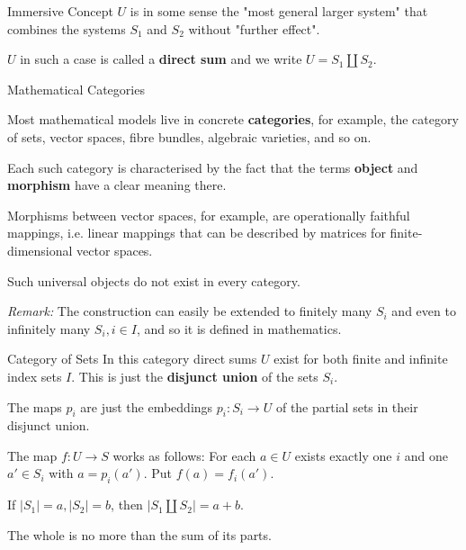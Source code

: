 \documentclass{beamer}
\begin{document}
\begin{frame}{Immersive Concept}
$U$ is in some sense the "most general larger system" that combines the
  systems $S_1$ and $S_2$ without "further effect".
  
$U$ in such a case is called a \textbf{direct sum} and we write $U = S_1
  \coprod S_2$.
\begin{center}
\end{center}
\end{frame}
\begin{frame}{Mathematical Categories}

Most mathematical models live in concrete \textbf{categories}, for example,
the category of sets, vector spaces, fibre bundles, algebraic varieties, and
so on.

Each such category is characterised by the fact that the terms \textbf{object}
and \textbf{morphism} have a clear meaning there.

Morphisms between vector spaces, for example, are operationally faithful
mappings, i.e. linear mappings that can be described by matrices for
finite-dimensional vector spaces.

Such universal objects do not exist in every category.

\emph{Remark:} The construction can easily be extended to finitely many $S_i$
and even to infinitely many $S_i, i\in I$, and so it is defined in
mathematics.
\end{frame}
\begin{frame}{Category of Sets}
In this category direct sums $U$ exist for both finite and infinite index sets
$I$. This is just the \textbf{disjunct union} of the sets $S_i$.

The maps $p_i$ are just the embeddings $p_i: S_i \rightarrow U$ of the partial
sets in their disjunct union.

The map $f: U \rightarrow S$ works as follows: For each $a\in U$ exists
exactly one $i$ and one $a'\in S_i$ with $a=p_i(a')$. Put $f(a)=f_i(a')$.

If $|S_1| = a, |S_2| = b$, then $|S_1 \coprod S_2| = a+b$.

The whole is no more than the sum of its parts.
\end{frame}
\end{document}
